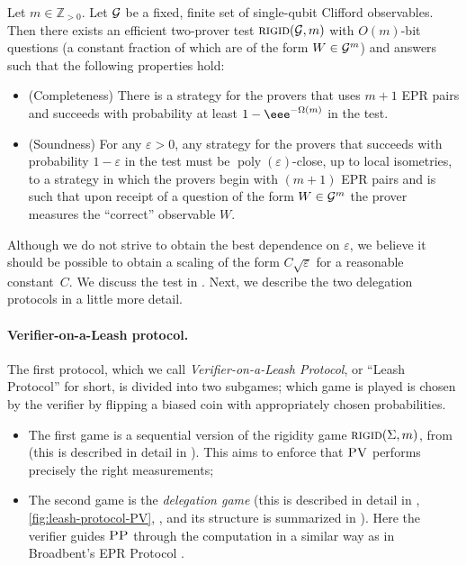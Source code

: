 \documentclass{toc}
\DeclareMathOperator{\poly}{poly}
\newcommand{\eps}{\varepsilon}
\newcommand{\rigid}{\textsc{rigid}}
\newcommand{\pv}{\textsc{PV}}
\newcommand{\pp}{\textsc{PP}}
\begin{document}
\begin{theorem}[Informal]\label{thm:rigid-informal}
Let $m\in\mathbb{Z}_{>0}$. Let $\cal G$ be a fixed, finite set of single-qubit Clifford observables. Then there exists an efficient two-prover test $\textsc{rigid}({\cal G},m)$ with $O(m)$-bit questions (a constant fraction of which are of the form $W\in{\cal G}^m$) and answers such that the following properties hold:
\begin{itemize}[nolistsep]
\item (Completeness) There is a strategy for the provers that uses $m+1$ EPR pairs and succeeds with probability at least $1 - \eee^{-\Omega(m)}$ in the test.
\item (Soundness) For any $\eps>0$, any strategy for the provers that succeeds with probability $1-\eps$ in the test must be $\poly(\eps)$-close, up to local isometries, to a strategy in which the provers begin with $(m+1)$ EPR pairs and is such that upon receipt of a question of the form $W\in {\cal G}^m$ the prover measures the ``correct'' observable $W$. 
\end{itemize}
\end{theorem}

Although we do not strive to obtain the best dependence on $\eps$, we believe it
should be possible to obtain a scaling of the form $C\sqrt{\eps}$ for a
reasonable constant~$C$. We discuss the test in . Next, we describe the two delegation protocols in a little more detail.

\paragraph{Verifier-on-a-Leash protocol.}  %
The first protocol, which we call \emph{Verifier-on-a-Leash
Protocol}, or ``Leash Protocol'' for short, is divided into two subgames; which game is played is chosen by the verifier by flipping a biased coin with appropriately chosen probabilities.
\begin{itemize}[nolistsep]
\item The first game is a sequential version of the rigidity game $\rigid(\Sigma,m)$, from  (this is described in detail in ). This aims to enforce that $\pv$ performs precisely the right measurements;
\item The second game is the \emph{delegation game} (this is described in detail in , \ref{fig:leash-protocol-PV}, , and its structure is summarized in ). Here the verifier guides $\pp$ through the computation in a similar way as in Broadbent's EPR Protocol \cite{broadbent15howtoverify}.
\end{itemize}
\end{document}
